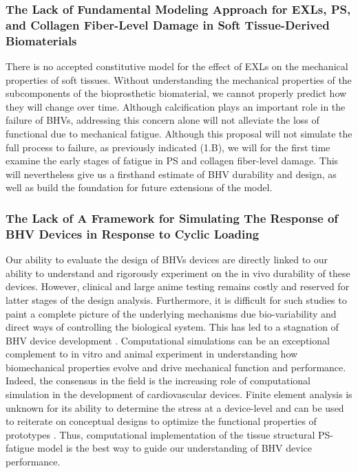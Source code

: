 \subsubsection{The Lack of Fundamental Modeling Approach for EXLs, PS, and Collagen Fiber-Level Damage in Soft Tissue-Derived Biomaterials}

    There is no accepted constitutive model for the effect of EXLs on the mechanical properties of soft tissues. Without understanding the mechanical properties of the subcomponents of the bioprosthetic biomaterial, we cannot properly predict how they will change over time. Although calcification plays an important role in the failure of BHVs, addressing this concern alone will not alleviate the loss of functional due to mechanical fatigue. Although this proposal will not simulate the full process to failure, as previously indicated (1.B), we will for the first time examine the early stages of fatigue in PS and collagen fiber-level damage. This will nevertheless give us a firsthand estimate of BHV durability and design, as well as build the foundation for future extensions of the model.

\subsubsection{The Lack of A Framework for Simulating The Response of BHV Devices in Response to Cyclic Loading}

    Our ability to evaluate the design of BHVs devices are directly linked to our ability to understand and rigorously experiment on the in vivo durability of these devices. However, clinical and large anime testing remains costly and reserved for latter stages of the design analysis. Furthermore, it is difficult for such studies to paint a complete picture of the underlying mechanisms due bio-variability and direct ways of controlling the biological system. This has led to a stagnation of BHV device development \cite{schoen_cardiac_2005}. Computational simulations can be an exceptional complement to in vitro and animal experiment in understanding how biomechanical properties evolve and drive mechanical function and performance. Indeed, the consensus in the field is the increasing role of computational simulation in the development of cardiovascular devices. Finite element analysis is unknown for its ability to determine the stress at a device-level and can be used to reiterate on conceptual designs to optimize the functional properties of prototypes \cite{patterson_comparative_1996,huang_two_1990,black_three_1991}. Thus, computational implementation of the tissue structural PS-fatigue model is the best way to guide our understanding of BHV device performance.

